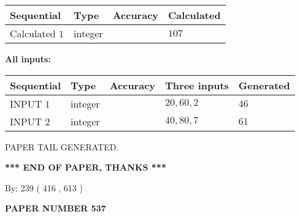 \documentclass{ctexart}
\begin{document}
   
   
   
\noindent{}
   
   
  
  
\noindent\begin{tabular}{|l|l|l|l|}
\hline
 Sequential & Type & Accuracy & Calculated \\ 
\hline
 
 
  Calculated $  1 $ & integer &  & 
  $ 107 $ 
 \\  \hline  
 \end{tabular}
   
   
   
   
\noindent\vspace{0.1in}\hspace{-0.08in} {\textbf{\Large{All inputs: }}}
   
   
  
  
\noindent\begin{tabular}{|l|l|l|l|l|}
\hline
 Sequential & Type & Accuracy & Three inputs & Generated \\ 
\hline
 
 
  INPUT $  1 $ & integer &  & $
 20
 , 
 60
 , 
 2
 $ & $ 46 $ 
 \\  \hline  
 
 
  INPUT $  2 $ & integer &  & $
 40
 , 
 80
 , 
 7
 $ & $ 61 $ 
 \\  \hline  
 \end{tabular}
   
   
   
   
   
   
 \vspace{0.2in}
 
   
   
\vspace{2.0in} PAPER TAIL GENERATED.
   
   
   
   
\vspace{1.0in} 
{\textbf{\large{ *** END OF PAPER, THANKS *** }}} 
   
   
\hspace{1.0in} By: 
 239 ( 416 ,  613 )
   
   
   
   
\newpage 
\setcounter{page}{ 
   537001 } 
   
   
   
   
 {\textbf{ \Large{ PAPER NUMBER  537  }}}
   
\end{document}
